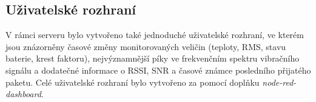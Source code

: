 \subsection{Uživatelské rozhraní}
    V rámci serveru bylo vytvořeno také jednoduché uživatelské rozhraní, ve kterém jsou znázorněny časové změny monitorovaných veličin (teploty, RMS, stavu baterie, krest faktoru), nejvýznamnější píky ve frekvenčním spektru vibračního signálu a dodatečné informace o RSSI, SNR a časové známce   posledního přijatého paketu. Celé uživatelské rozhraní bylo vytvořeno za pomocí doplňku \textit{node-red-dashboard}.
    
    

    
    